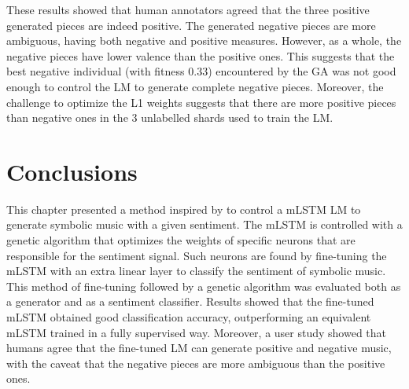 These results showed that human annotators agreed that the three positive generated pieces are indeed positive. The generated negative pieces are more ambiguous, having both negative and positive measures. However, as a whole, the negative pieces have lower valence than the positive ones. This suggests that the best negative individual (with fitness $0.33$) encountered by the GA was not good enough to control the LM to generate complete negative pieces. Moreover, the challenge to optimize the L1 weights suggests that there are more positive pieces than negative ones in the 3 unlabelled shards used to train the LM.

\section{Conclusions}

This chapter presented a method inspired by \citet{radford_2017} to control a mLSTM LM to generate symbolic music with a given sentiment. The mLSTM is controlled with a genetic algorithm that optimizes the weights of specific neurons that are responsible for the sentiment signal. Such neurons are found by fine-tuning the mLSTM with an extra linear layer to classify the sentiment of symbolic music. This method of fine-tuning followed by a genetic algorithm was evaluated both as a generator and as a sentiment classifier. Results showed that the fine-tuned mLSTM obtained good classification accuracy, outperforming an equivalent mLSTM trained in a fully supervised way. Moreover, a user study showed that humans agree that the fine-tuned LM can generate positive and negative music, with the caveat that the negative pieces are more ambiguous than the positive ones.

